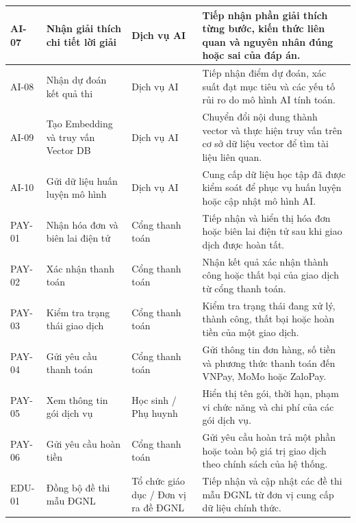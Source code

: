 \begin{longtable}{|p{}|p{}|p{}|p{}|}
AI-07 &
Nhận giải thích chi tiết lời giải &
Dịch vụ AI &
Tiếp nhận phần giải thích từng bước, kiến thức liên quan và nguyên nhân đúng hoặc sai của đáp án. \\
\hline

AI-08 &
Nhận dự đoán kết quả thi &
Dịch vụ AI &
Tiếp nhận điểm dự đoán, xác suất đạt mục tiêu và các yếu tố rủi ro do mô hình AI tính toán. \\
\hline

AI-09 &
Tạo Embedding và truy vấn Vector DB &
Dịch vụ AI &
Chuyển đổi nội dung thành vector và thực hiện truy vấn trên cơ sở dữ liệu vector để tìm tài liệu liên quan. \\
\hline

AI-10 &
Gửi dữ liệu huấn luyện mô hình &
Dịch vụ AI &
Cung cấp dữ liệu học tập đã được kiểm soát để phục vụ huấn luyện hoặc cập nhật mô hình AI. \\
\hline

PAY-01 &
Nhận hóa đơn và biên lai điện tử &
Cổng thanh toán &
Tiếp nhận và hiển thị hóa đơn hoặc biên lai điện tử sau khi giao dịch được hoàn tất. \\
\hline

PAY-02 &
Xác nhận thanh toán &
Cổng thanh toán &
Nhận kết quả xác nhận thành công hoặc thất bại của giao dịch từ cổng thanh toán. \\
\hline

PAY-03 &
Kiểm tra trạng thái giao dịch &
Cổng thanh toán &
Kiểm tra trạng thái đang xử lý, thành công, thất bại hoặc hoàn tiền của một giao dịch. \\
\hline

PAY-04 &
Gửi yêu cầu thanh toán &
Cổng thanh toán &
Gửi thông tin đơn hàng, số tiền và phương thức thanh toán đến VNPay, MoMo hoặc ZaloPay. \\
\hline

PAY-05 &
Xem thông tin gói dịch vụ &
Học sinh / Phụ huynh &
Hiển thị tên gói, thời hạn, phạm vi chức năng và chi phí của các gói dịch vụ. \\
\hline

PAY-06 &
Gửi yêu cầu hoàn tiền &
Cổng thanh toán &
Gửi yêu cầu hoàn trả một phần hoặc toàn bộ giá trị giao dịch theo chính sách của hệ thống. \\
\hline

EDU-01 &
Đồng bộ đề thi mẫu ĐGNL &
Tổ chức giáo dục / Đơn vị ra đề ĐGNL &
Tiếp nhận và cập nhật các đề thi mẫu ĐGNL từ đơn vị cung cấp dữ liệu chính thức. \\
\hline


\end{longtable}
